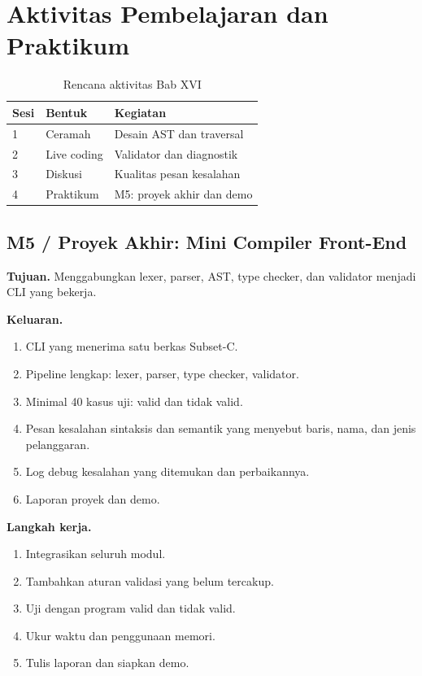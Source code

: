 \section*{Aktivitas Pembelajaran dan Praktikum}

\begin{table}[H]
\centering
\caption{Rencana aktivitas Bab XVI}
\label{tab:ch16-aktivitas}
\begin{tabularx}{\textwidth}{@{}llX@{}}
\toprule
\textbf{Sesi} & \textbf{Bentuk} & \textbf{Kegiatan} \\
\midrule
1 & Ceramah & Desain AST dan traversal \\
2 & Live coding & Validator dan diagnostik \\
3 & Diskusi & Kualitas pesan kesalahan \\
4 & Praktikum & M5: proyek akhir dan demo \\
\bottomrule
\end{tabularx}
\end{table}

\subsection*{M5 / Proyek Akhir: Mini Compiler Front-End}
\textbf{Tujuan.} Menggabungkan lexer, parser, AST, type checker, dan
validator menjadi CLI yang bekerja.

\textbf{Keluaran.}
\begin{enumerate}[label=\arabic*.,leftmargin=*]
  \item CLI  yang menerima satu berkas Subset-C.
  \item Pipeline lengkap: lexer, parser, type checker, validator.
  \item Minimal 40 kasus uji: valid dan tidak valid.
  \item Pesan kesalahan sintaksis dan semantik yang menyebut baris,
        nama, dan jenis pelanggaran.
  \item Log debug kesalahan yang ditemukan dan perbaikannya.
  \item Laporan proyek dan demo.
\end{enumerate}

\textbf{Langkah kerja.}
\begin{enumerate}[label=\arabic*.,leftmargin=*]
  \item Integrasikan seluruh modul.
  \item Tambahkan aturan validasi yang belum tercakup.
  \item Uji dengan program valid dan tidak valid.
  \item Ukur waktu dan penggunaan memori.
  \item Tulis laporan dan siapkan demo.
\end{enumerate}

